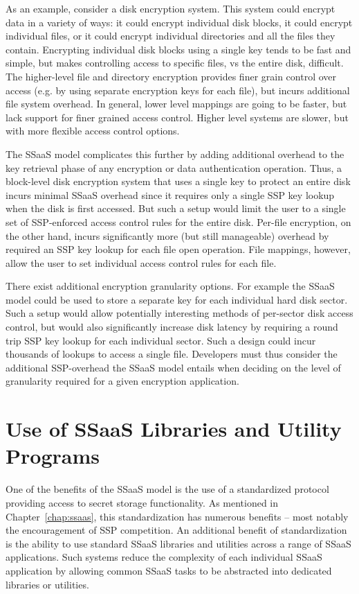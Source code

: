 As an example, consider a disk encryption system. This system could
encrypt data in a variety of ways: it could encrypt individual disk
blocks, it could encrypt individual files, or it could encrypt
individual directories and all the files they contain. Encrypting
individual disk blocks using a single key tends to be fast and simple,
but makes controlling access to specific files, vs the entire disk,
difficult. The higher-level file and directory encryption provides
finer grain control over access (e.g. by using separate encryption
keys for each file), but incurs additional file system overhead. In
general, lower level mappings are going to be faster, but lack support
for finer grained access control. Higher level systems are slower, but
with more flexible access control options.

The SSaaS model complicates this further by adding additional overhead
to the key retrieval phase of any encryption or data authentication
operation. Thus, a block-level disk encryption system that uses a
single key to protect an entire disk incurs minimal SSaaS overhead
since it requires only a single SSP key lookup when the disk is first
accessed. But such a setup would limit the user to a single set of
SSP-enforced access control rules for the entire disk. Per-file
encryption, on the other hand, incurs significantly more (but still
manageable) overhead by required an SSP key lookup for each file open
operation. File mappings, however, allow the user to set individual
access control rules for each file.

There exist additional encryption granularity options. For example the
SSaaS model could be used to store a separate key for each individual
hard disk sector. Such a setup would allow potentially interesting
methods of per-sector disk access control, but would also
significantly increase disk latency by requiring a round trip SSP key
lookup for each individual sector. Such a design could incur thousands
of lookups to access a single file. Developers must thus consider the
additional SSP-overhead the SSaaS model entails when deciding on the
level of granularity required for a given encryption application.

\section{Use of SSaaS Libraries and Utility Programs}

One of the benefits of the SSaaS model is the use of a standardized
protocol providing access to secret storage functionality. As
mentioned in Chapter~\ref{chap:ssaas}, this standardization has
numerous benefits -- most notably the encouragement of SSP
competition. An additional benefit of standardization is the ability
to use standard SSaaS libraries and utilities across a range of SSaaS
applications. Such systems reduce the complexity of each individual
SSaaS application by allowing common SSaaS tasks to be abstracted into
dedicated libraries or utilities.

